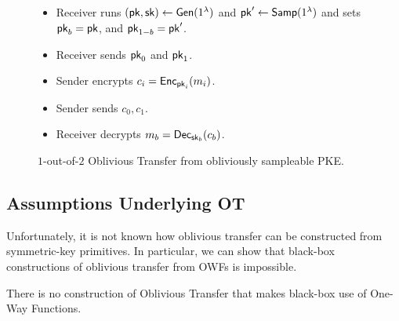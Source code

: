 \begin{figure}[h]
	\begin{mdframed}[
		linecolor=black,
		linewidth=1pt,
		roundcorner=5pt,
		backgroundcolor=white,
		userdefinedwidth=\textwidth,
		]
		\vspace{2mm}
		\begin{itemize}
			\item Receiver runs $(\mathsf{pk},\mathsf{sk})\gets\mathsf{Gen}(1^\lambda)$ and $\mathsf{pk}'\gets\mathsf{Samp}(1^\lambda)$ and sets $\mathsf{pk}_b=\mathsf{pk}$, and $\mathsf{pk}_{1-b}=\mathsf{pk}'$.
			\item Receiver sends $\mathsf{pk}_0$ and $\mathsf{pk}_1$.
			\item Sender encrypts $c_i=\mathsf{Enc}_{\mathsf{pk}_i}(m_i)$.
			\item Sender sends $c_0, c_1$.
			\item Receiver decrypts $m_b = \mathsf{Dec}_{\mathsf{sk}_b}(c_b)$.
		\end{itemize}
		\vspace{2mm}
	\end{mdframed}
	\caption{$1$-out-of-$2$ Oblivious Transfer from obliviously sampleable PKE.}
	\label{fig:piot}
\end{figure}

\subsection{Assumptions Underlying OT}

Unfortunately, it is not known how oblivious transfer can be constructed from symmetric-key primitives. In particular, we can show that black-box constructions of oblivious transfer from OWFs is impossible.

\begin{theorem}
	There \rarrow is no construction of Oblivious Transfer that makes black-box use of One-Way Functions.
\end{theorem}

